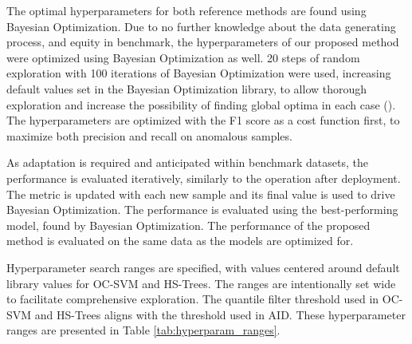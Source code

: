 The optimal hyperparameters for both reference methods are found using Bayesian Optimization. Due to no further knowledge about the data generating process, and equity in benchmark, the hyperparameters of our proposed method were optimized using Bayesian Optimization as well. 20 steps of random exploration with 100 iterations of Bayesian Optimization were used, increasing default values set in the Bayesian Optimization library, to allow thorough exploration and increase the possibility of finding global optima in each case (\cite{Nogueira2014}). The hyperparameters are optimized with the F1 score as a cost function first, to maximize both precision and recall on anomalous samples. %

As adaptation is required and anticipated within benchmark datasets, the performance is evaluated iteratively, similarly to the operation after deployment. The metric is updated with each new sample and its final value is used to drive Bayesian Optimization. The performance is evaluated using the best-performing model, found by Bayesian Optimization. The performance of the proposed method is evaluated on the same data as the models are optimized for.

Hyperparameter search ranges are specified, with values centered around default library values for OC-SVM and HS-Trees. The ranges are intentionally set wide to facilitate comprehensive exploration. The quantile filter threshold used in OC-SVM and HS-Trees aligns with the threshold used in AID. These hyperparameter ranges are presented in Table \ref{tab:hyperparam_ranges}.

